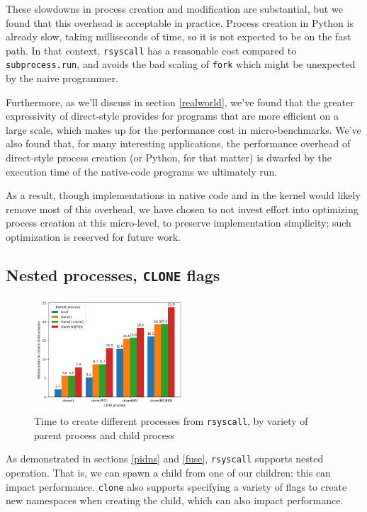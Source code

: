 \documentclass[letterpaper,twocolumn,10pt]{article}
\begin{document}
These slowdowns in process creation and modification are substantial,
but we found that this overhead is acceptable in practice.
Process creation in Python is already slow, taking milliseconds of time,
so it is not expected to be on the fast path.
In that context, \texttt{rsyscall} has a reasonable cost compared to \texttt{subprocess.run},
and avoids the bad scaling of \texttt{fork} which might be unexpected by the naive programmer.

Furthermore, as we'll discuss in section \ref{realworld},
we've found that the greater expressivity of direct-style
provides for programs that are more efficient on a large scale,
which makes up for the performance cost in micro-benchmarks.
We've also found that, for many interesting applications,
the performance overhead of direct-style process creation (or Python, for that matter)
is dwarfed by the execution time of the native-code programs we ultimately run.

As a result, though implementations in native code and in the kernel would likely remove most of this overhead,
we have chosen to not invest effort into optimizing process creation at this micro-level,
to preserve implementation simplicity;
such optimization is reserved for future work.
\subsection{Nested processes, \texttt{CLONE} flags}\label{clone_bench}
\begin{figure}
\centering
 \includegraphics[width=0.5\textwidth]{clone_bench}
 \caption{Time to create different processes from \texttt{rsyscall}, by variety of parent process and child process}
 \label{fig:clone_bench}
\end{figure}
As demonstrated in sections \ref{pidns} and \ref{fuse},
\texttt{rsyscall} supports nested operation.
That is, we can spawn a child from one of our children;
this can impact performance.
\texttt{clone} also supports specifying a variety of flags to create new namespaces when creating the child,
which can also impact performance.
\end{document}
